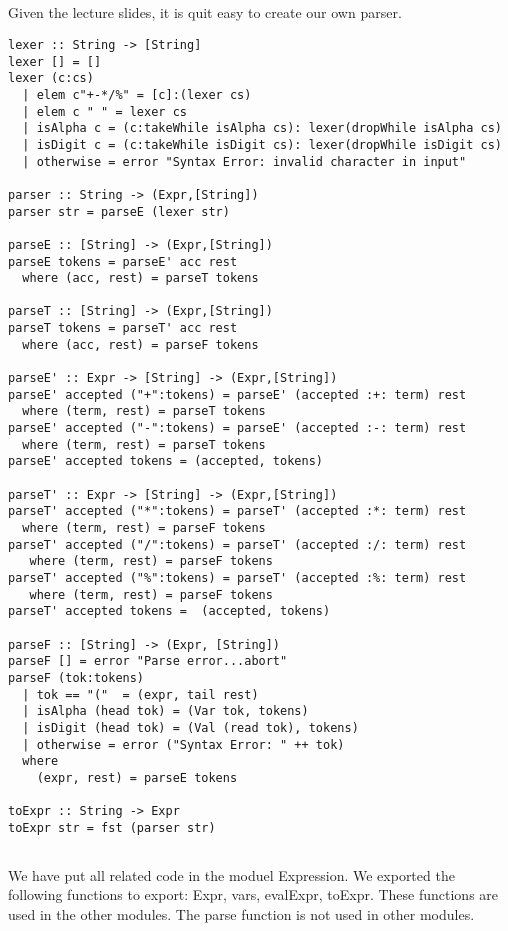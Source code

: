 \documentclass[a4paper,11pt]{article}
\begin{document}
\subsection{}
Given the lecture slides, it is quit easy to create our own parser. 

\begin{lstlisting}
lexer :: String -> [String]
lexer [] = []
lexer (c:cs)
  | elem c"+-*/%" = [c]:(lexer cs)
  | elem c " " = lexer cs
  | isAlpha c = (c:takeWhile isAlpha cs): lexer(dropWhile isAlpha cs)
  | isDigit c = (c:takeWhile isDigit cs): lexer(dropWhile isDigit cs)
  | otherwise = error "Syntax Error: invalid character in input"
  
parser :: String -> (Expr,[String])
parser str = parseE (lexer str)

parseE :: [String] -> (Expr,[String])
parseE tokens = parseE' acc rest
  where (acc, rest) = parseT tokens

parseT :: [String] -> (Expr,[String])
parseT tokens = parseT' acc rest
  where (acc, rest) = parseF tokens 

parseE' :: Expr -> [String] -> (Expr,[String])
parseE' accepted ("+":tokens) = parseE' (accepted :+: term) rest
  where (term, rest) = parseT tokens
parseE' accepted ("-":tokens) = parseE' (accepted :-: term) rest
  where (term, rest) = parseT tokens
parseE' accepted tokens = (accepted, tokens)

parseT' :: Expr -> [String] -> (Expr,[String])
parseT' accepted ("*":tokens) = parseT' (accepted :*: term) rest
  where (term, rest) = parseF tokens
parseT' accepted ("/":tokens) = parseT' (accepted :/: term) rest
   where (term, rest) = parseF tokens
parseT' accepted ("%":tokens) = parseT' (accepted :%: term) rest
   where (term, rest) = parseF tokens
parseT' accepted tokens =  (accepted, tokens)

parseF :: [String] -> (Expr, [String])
parseF [] = error "Parse error...abort"
parseF (tok:tokens)
  | tok == "("  = (expr, tail rest)
  | isAlpha (head tok) = (Var tok, tokens)
  | isDigit (head tok) = (Val (read tok), tokens)
  | otherwise = error ("Syntax Error: " ++ tok)
  where
    (expr, rest) = parseE tokens

toExpr :: String -> Expr
toExpr str = fst (parser str)
\end{lstlisting}

\subsection{}
We have put all related code in the moduel Expression. We exported the following functions to export: Expr, vars, evalExpr, toExpr. These functions are used in the other modules. The parse function is not used in other modules.
\end{document}
